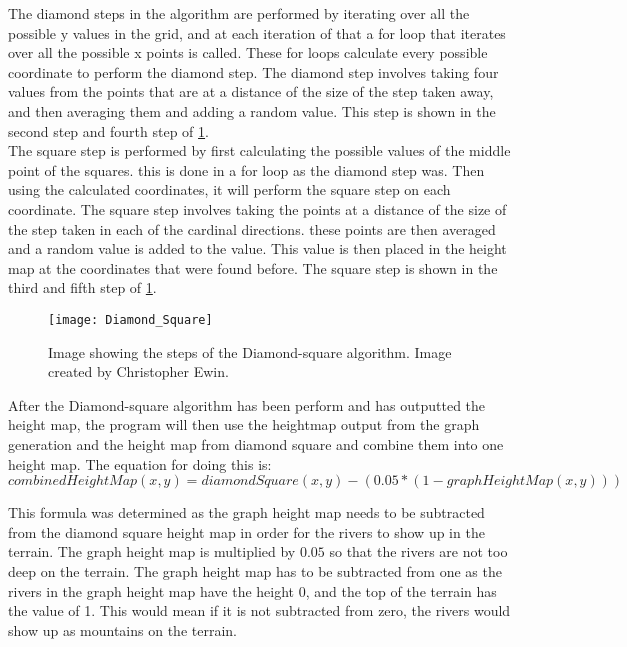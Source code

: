 
	The diamond steps in the algorithm are performed by iterating over all the possible y values in the grid, and at each iteration of that a for loop that iterates over all the possible x points is called. These for loops calculate every possible coordinate to perform the diamond step. The diamond step involves taking four values from the points that are at a distance of the size of the step taken away, and then averaging them and adding a random value. This step is shown in the second step and fourth step of \ref{fig:DiamondSquare}.\\


	The square step is performed by first calculating the possible values of the middle point of the squares. this is done in a for loop as the diamond step was. Then using the calculated coordinates, it will perform the square step on each coordinate. The square step involves taking the points at a distance of the size of the step taken in each of the cardinal directions. these points are then averaged and a random value is added to the value. This value is then placed in the height map at the coordinates that were found before. The square step is shown in the third and fifth step of \ref{fig:DiamondSquare}.

\begin{figure}[H]
	\texttt{[image: Diamond\_Square]}
	\centering
	\caption{Image showing the steps of the Diamond-square algorithm. Image created by Christopher Ewin.}
	\label{fig:DiamondSquare}
\end{figure}

	After the Diamond-square algorithm has been perform and has outputted the height map, the program will then use the heightmap output from the graph generation and the height map from diamond square and combine them into one height map. The equation for doing this is:\\

	$$combinedHeightMap(x, y) =  diamondSquare(x, y) - (0.05 * (1 - graphHeightMap(x, y)))$$

	This formula was determined as the graph height map needs to be subtracted from the diamond square height map in order for the rivers to show up in the terrain. The graph height map is multiplied by $0.05$ so that the rivers are not too deep on the terrain. The graph height map has to be subtracted from one as the rivers in the graph height map have the height 0, and the top of the terrain has the value of 1. This would mean if it is not subtracted from zero, the rivers would show up as mountains on the terrain.\\

